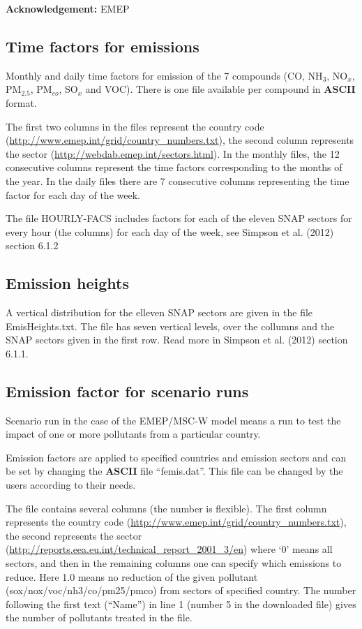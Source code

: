 {\bf Acknowledgement:} EMEP

\subsection{Time factors for emissions}

Monthly and daily time factors for emission of the 7 compounds 
(CO, NH$_{3}$, NO$_{x}$, PM$_{2.5}$, PM$_{co}$, SO$_{x}$ and VOC). 
There is one file available per compound in {\bf ASCII} format. 

The first two columns in the files represent the country code \\
(\url{http://www.emep.int/grid/country_numbers.txt}), the second column 
represents the sector (\url{http://webdab.emep.int/sectors.html}). In the monthly files, 
the 12 consecutive columns represent the time factors corresponding to 
the months of the year. In the daily files there are 7 consecutive columns representing 
the time factor for each day of the week. 

The file HOURLY-FACS 
includes factors for each of the eleven SNAP sectors for every hour (the columns) for 
each day of the week, see Simpson et al. (2012) section 6.1.2


\subsection{Emission heights}
A vertical distribution for the elleven SNAP sectors are given in the file EmisHeights.txt. 
The file has seven vertical levels, over the collumns and the SNAP sectors given in the first row. 
Read more in Simpson et al. (2012) section 6.1.1.

\subsection{Emission factor for scenario runs}\label{sec:femis}
Scenario run in the case of the EMEP/MSC-W model means a run to test
the impact of one or more pollutants from a particular
country. 

Emission factors are applied to specified countries and
emission sectors and can be set by changing the {\bf ASCII} file
``femis.dat''. 
This file can be changed by the users according to their needs.

The file contains several columns (the number is flexible). The first column represents
the country code (\url{http://www.emep.int/grid/country_numbers.txt}),
the second represents the sector
(\url{http://reports.eea.eu.int/technical_report_2001_3/en}) 
where `0' means all sectors, and then in the remaining
 columns one can specify
which emissions to reduce. Here 1.0 means no reduction of the given
pollutant 
(sox/nox/voc/nh3/co/pm25/pmco) from sectors of specified country. The
number following the first text (``Name'') in line 1 (number 5 in
the downloaded file) gives the number of pollutants treated in the file.


